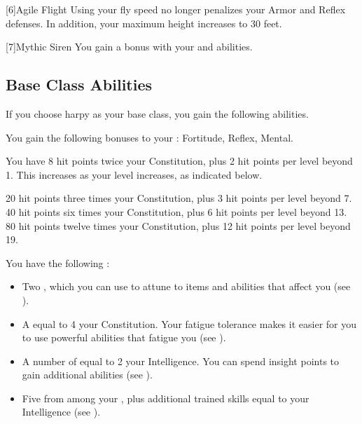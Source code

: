         [6]{Agile Flight} Using your fly speed no longer penalizes your Armor and Reflex defenses.
        In addition, your maximum height increases to 30 feet.

        [7]{Mythic Siren} You gain a   bonus with your  and  abilities.

    \subsection{Base Class Abilities}
        If you choose harpy as your base class, you gain the following abilities.

        You gain the following bonuses to your :  Fortitude,  Reflex,  Mental.

            You have 8 hit points \add twice your Constitution, plus 2 hit points per level beyond 1.
            This increases as your level increases, as indicated below.
            \begin{itemize}
                 20 hit points \add three times your Constitution, plus 3 hit points per level beyond 7.
                 40 hit points \add six times your Constitution, plus 6 hit points per level beyond 13.
                 80 hit points \add twelve times your Constitution, plus 12 hit points per level beyond 19.
            \end{itemize}

         You have the following :
        \begin{itemize}
            \item Two , which you can use to attune to items and abilities that affect you (see ).
            \item A  equal to 4 \add your Constitution.
                Your fatigue tolerance makes it easier for you to use powerful abilities that fatigue you (see ).
            \item A number of  equal to 2 \add your Intelligence.
                You can spend insight points to gain additional abilities (see ).
            \item Five  from among your , plus additional trained skills equal to your Intelligence (see ).
        \end{itemize}


